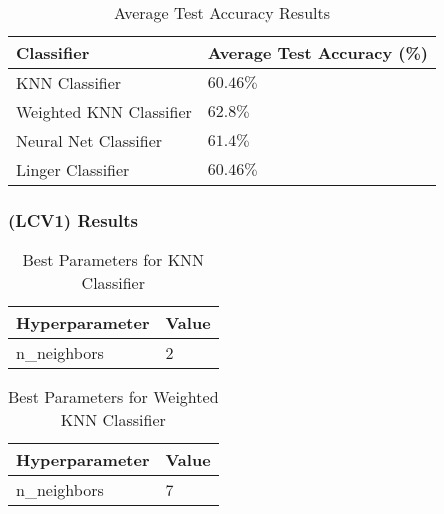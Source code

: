\documentclass[a4paper, 12pt]{report}
\begin{document}
\begin{table}[H]
    \centering
    \caption{Average Test Accuracy Results}
    \label{tab:average_results_test_Glass}
    \begin{tabular}{|l|l|}
    \hline
    \textbf{Classifier} & \textbf{Average Test Accuracy (\%)} \\ \hline
    KNN Classifier & $60.46\%$ \\ \hline
    Weighted KNN Classifier & $62.8\%$ \\ \hline
    Neural Net Classifier & $61.4\%$ \\ \hline
    Linger Classifier & $60.46\%$ \\ \hline
    \end{tabular}
\end{table}

\subsubsection{(LCV1) Results}

\begin{table}[H]
    \centering
    \caption{Best Parameters for KNN Classifier}
    \label{tab:best_parameters_knn_LCV1_Glass}
    \begin{tabular}{|l|l|}
    \hline
    \textbf{Hyperparameter} & \textbf{Value} \\ \hline
    n\_neighbors & 2 \\ \hline
    \end{tabular}
\end{table}

\begin{table}[H]
    \centering
    \caption{Best Parameters for Weighted KNN Classifier}
    \label{tab:best_parameters_weighted_knn_LCV1_Glass}
    \begin{tabular}{|l|l|}
    \hline
    \textbf{Hyperparameter} & \textbf{Value} \\ \hline
    n\_neighbors & 7 \\ \hline
    \end{tabular}
\end{table}
\end{document}
